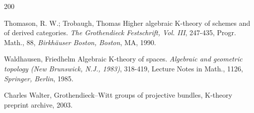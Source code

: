 \documentclass[12pt]{article}
\begin{document}
\begin{thebibliography}{200}

 Thomason, R. W.; Trobaugh, Thomas Higher algebraic K-theory of schemes and of derived categories. {\it The Grothendieck Festschrift, Vol. III}, 247-435, Progr. Math., 88, {\it Birkh\"{a}user Boston, Boston}, MA, 1990.



 Waldhausen, Friedhelm Algebraic K-theory of spaces. {\it Algebraic and geometric topology (New Brunswick, N.J., 1983)}, 318-419, Lecture Notes in Math., 1126, {\it Springer, Berlin}, 1985.

  Charles Walter, Grothendieck–Witt groups of projective bundles, K-theory preprint archive, 2003.


%


 \end{thebibliography}
\end{document}
